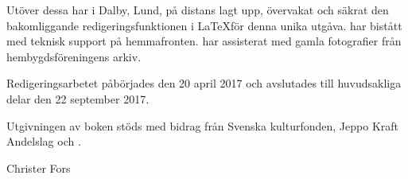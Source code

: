 Utöver dessa har  i Dalby, Lund, på distans lagt upp, övervakat och säkrat den bakomliggande redigeringsfunktionen i  \LaTeX  för denna unika utgåva.  har bistått med teknisk support på hemmafronten.  har assisterat med gamla fotografier från hembygdsföreningens arkiv.

Redigeringsarbetet påbörjades den 20 april 2017 och avslutades till huvudsakliga delar den 22 september 2017.

Utgivningen av boken stöds med bidrag från Svenska kulturfonden, Jeppo Kraft Andelslag och .


Christer Fors
